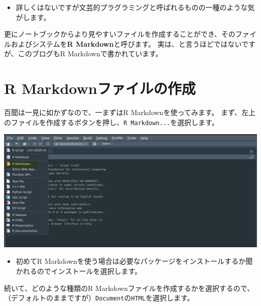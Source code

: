 \documentclass[]{bxjsreport}
\providecommand{\tightlist}{%
  \setlength{\itemsep}{0pt}\setlength{\parskip}{0pt}}
\let\asdf\section
\renewcommand{\section}{\chapter}
\renewcommand{\subsection}{\asdf}
\begin{document}
\begin{itemize}
\tightlist
\item
  詳しくはないですが文芸的プラグラミングと呼ばれるものの一種のような気がします。
\end{itemize}

更にノートブックからより見やすいファイルを作成することができ、そのファイルおよびシステムを\textbf{R Markdown}と呼びます。
実は、と言うほどではないですが、このブログもR Markdownで書かれています。

\hypertarget{r-markdownux30d5ux30a1ux30a4ux30ebux306eux4f5cux6210}{%
\subsection{R Markdownファイルの作成}\label{r-markdownux30d5ux30a1ux30a4ux30ebux306eux4f5cux6210}}

百聞は一見に如かずなので、一まずはR Markdownを使ってみます。
まず、左上のファイルを作成するボタンを押し、\texttt{R\ Markdown...}を選択します。

\includegraphics{figures/rmarkdown_html1.jpg}

\begin{itemize}
\tightlist
\item
  初めてR Markdownを使う場合は必要なパッケージをインストールするか聞かれるのでインストールを選択します。
\end{itemize}

続いて、どのような種類のR Markdownファイルを作成するかを選択するので、（デフォルトのままですが）\texttt{Document}の\texttt{HTML}を選択します。
\end{document}
